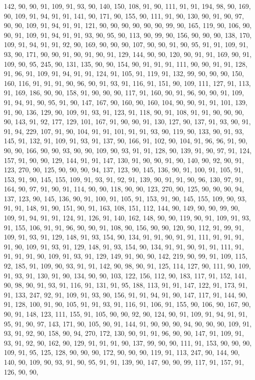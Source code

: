 \begin{sloppypar}
142, 90, 90, 91, 109, 91, 93, 90, 140, 150, 108, 91, 90, 111, 91, 91, 194, 98, 90, 169, 90, 109, 91, 94, 91, 91, 141, 90, 171, 90, 155, 90, 111, 91, 90, 130, 90, 91, 90, 97, 90, 90, 109, 91, 94, 91, 91, 121, 90, 90, 90, 90, 90, 90, 99, 90, 165, 119, 90, 106, 90, 90, 91, 109, 91, 94, 91, 91, 93, 90, 95, 90, 113, 90, 99, 90, 156, 90, 90, 90, 138, 170, 109, 91, 94, 91, 91, 92, 90, 169, 90, 90, 90, 107, 90, 90, 91, 90, 95, 91, 91, 109, 91, 93, 90, 171, 90, 90, 91, 90, 91, 90, 91, 129, 144, 90, 90, 120, 90, 91, 91, 169, 90, 91, 109, 90, 95, 245, 90, 131, 135, 90, 90, 154, 90, 91, 91, 91, 111, 90, 90, 91, 91, 128, 91, 96, 91, 109, 91, 94, 91, 91, 124, 91, 105, 91, 119, 91, 132, 99, 90, 90, 90, 150, 160, 116, 91, 91, 91, 90, 96, 90, 91, 93, 91, 116, 91, 151, 90, 109, 111, 127, 91, 113, 91, 169, 186, 90, 90, 158, 91, 90, 90, 90, 117, 91, 160, 90, 91, 96, 90, 90, 91, 109, 91, 94, 91, 90, 95, 91, 90, 147, 167, 90, 160, 90, 160, 104, 90, 90, 91, 91, 101, 139, 91, 90, 136, 129, 90, 109, 91, 93, 91, 123, 91, 118, 90, 91, 108, 91, 91, 90, 90, 90, 90, 143, 91, 92, 177, 129, 101, 167, 91, 90, 90, 91, 130, 127, 90, 137, 91, 93, 90, 91, 91, 94, 229, 107, 91, 90, 104, 91, 91, 101, 91, 91, 93, 90, 119, 90, 133, 90, 91, 93, 145, 91, 132, 91, 109, 91, 93, 91, 137, 90, 166, 91, 102, 90, 104, 91, 96, 96, 91, 90, 90, 90, 166, 90, 90, 93, 90, 90, 109, 90, 93, 91, 91, 128, 90, 139, 91, 90, 97, 91, 124, 157, 91, 90, 90, 129, 144, 91, 91, 147, 130, 91, 90, 90, 91, 90, 140, 90, 92, 90, 91, 123, 270, 90, 125, 90, 90, 90, 94, 137, 123, 90, 145, 136, 90, 91, 100, 91, 105, 91, 153, 91, 90, 145, 155, 109, 91, 93, 91, 92, 91, 139, 90, 91, 91, 90, 96, 130, 97, 91, 164, 90, 97, 91, 90, 91, 114, 90, 90, 118, 90, 90, 123, 270, 90, 125, 90, 90, 90, 94, 137, 123, 90, 145, 136, 90, 91, 100, 91, 105, 91, 153, 91, 90, 145, 155, 109, 90, 93, 91, 91, 148, 91, 90, 151, 90, 91, 163, 108, 151, 112, 144, 90, 149, 90, 90, 99, 90, 109, 91, 94, 91, 91, 124, 91, 126, 91, 140, 162, 148, 90, 90, 119, 90, 91, 109, 91, 93, 91, 155, 106, 91, 91, 96, 90, 90, 91, 108, 90, 156, 90, 90, 120, 90, 112, 91, 99, 91, 109, 91, 93, 91, 129, 148, 91, 93, 154, 90, 134, 91, 91, 90, 91, 91, 111, 91, 91, 91, 91, 90, 109, 91, 93, 91, 129, 148, 91, 93, 154, 90, 134, 91, 91, 90, 91, 91, 111, 91, 91, 91, 91, 90, 109, 91, 93, 91, 129, 149, 91, 90, 90, 142, 219, 90, 99, 91, 109, 115, 92, 185, 91, 109, 90, 93, 91, 91, 142, 90, 98, 90, 91, 125, 114, 127, 90, 111, 90, 109, 91, 93, 91, 130, 91, 90, 134, 90, 90, 103, 122, 156, 112, 90, 183, 117, 91, 152, 141, 90, 98, 90, 91, 93, 91, 116, 91, 131, 91, 95, 188, 113, 91, 91, 147, 122, 91, 173, 91, 91, 133, 247, 92, 91, 109, 91, 93, 90, 156, 91, 91, 94, 91, 90, 147, 117, 91, 144, 90, 91, 128, 100, 91, 90, 105, 91, 91, 93, 91, 116, 91, 106, 91, 155, 90, 106, 90, 167, 90, 90, 91, 148, 123, 111, 155, 91, 105, 90, 90, 92, 90, 124, 90, 91, 109, 91, 94, 91, 91, 95, 91, 90, 97, 143, 171, 90, 105, 90, 91, 144, 91, 90, 90, 90, 94, 90, 90, 90, 109, 91, 93, 91, 92, 90, 158, 90, 94, 270, 172, 130, 90, 91, 91, 96, 90, 90, 147, 91, 109, 91, 93, 91, 92, 90, 162, 90, 129, 91, 91, 91, 90, 137, 99, 90, 90, 111, 91, 153, 90, 90, 90, 109, 91, 95, 125, 128, 90, 90, 90, 172, 90, 90, 90, 119, 91, 113, 247, 90, 144, 90, 140, 90, 109, 90, 93, 91, 90, 95, 91, 91, 139, 90, 147, 90, 90, 99, 117, 91, 157, 91, 126, 90, 90, 
\end{sloppypar}

